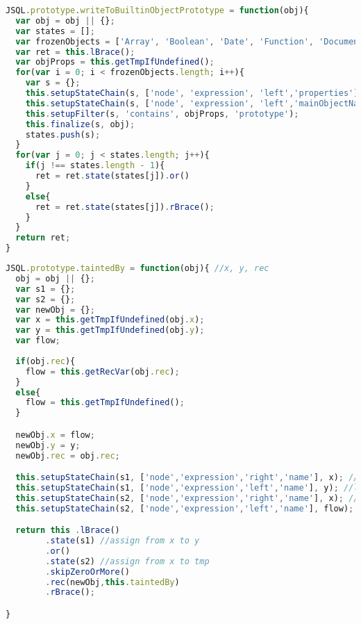 \documentclass[a4paper, 12pt]{report}
\theoremstyle{definition}
\begin{document}
\begin{appendices}
\begin{lstlisting}[label={lst:assignPredicate},language=JavaScript,caption=The \texttt{assign} predicate,mathescape=true]
JSQL.prototype.writeToBuiltinObjectPrototype = function(obj){
  var obj = obj || {};
  var states = [];
  var frozenObjects = ['Array', 'Boolean', 'Date', 'Function', 'Document', 'Math', 'Window','String'];
  var ret = this.lBrace();
  var objProps = this.getTmpIfUndefined();
  for(var i = 0; i < frozenObjects.length; i++){
    var s = {};
    this.setupStateChain(s, ['node', 'expression', 'left','properties'], objProps);
    this.setupStateChain(s, ['node', 'expression', 'left','mainObjectName'], frozenObjects[i]);
    this.setupFilter(s, 'contains', objProps, 'prototype');
    this.finalize(s, obj);
    states.push(s);
  }
  for(var j = 0; j < states.length; j++){
    if(j !== states.length - 1){
      ret = ret.state(states[j]).or()
    }
    else{
      ret = ret.state(states[j]).rBrace();
    }
  }
  return ret;
}
\end{lstlisting}

\begin{lstlisting}[label={lst:taintedBy},language=JavaScript,caption=The \texttt{taintedBy} recursive policy,mathescape=true]  % float=t?
JSQL.prototype.taintedBy = function(obj){ //x, y, rec
  obj = obj || {};
  var s1 = {};
  var s2 = {};
  var newObj = {};
  var x = this.getTmpIfUndefined(obj.x);
  var y = this.getTmpIfUndefined(obj.y);
  var flow;
  
  if(obj.rec){
    flow = this.getRecVar(obj.rec);
  }
  else{
    flow = this.getTmpIfUndefined();
  }

  newObj.x = flow;
  newObj.y = y;
  newObj.rec = obj.rec;

  this.setupStateChain(s1, ['node','expression','right','name'], x); //alias
  this.setupStateChain(s1, ['node','expression','left','name'], y); //leaked
  this.setupStateChain(s2, ['node','expression','right','name'], x); //alias
  this.setupStateChain(s2, ['node','expression','left','name'], flow); //leaked

  return this .lBrace()
        .state(s1) //assign from x to y
        .or()
        .state(s2) //assign from x to tmp
        .skipZeroOrMore()
        .rec(newObj,this.taintedBy)
        .rBrace();

}
\end{lstlisting}

\begin{lstlisting}[label={lst:WriteToBuiltinObjectPrototype},language=JavaScript,caption=The \texttt{writeToBuiltinObjectPrototype} policy,mathescape=true]  % float=t?


\end{lstlisting}
\end{appendices}
\end{document}
